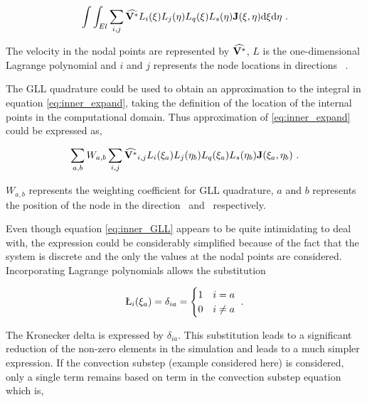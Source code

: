  \begin{equation} \centering
 \label{eq:inner_expand}
 \int\int_{El}\sum_{i,j}\widehat{\Vint}L_{i}(\compone)L_{j}(\comptwo)L_{q}(\compone)L_{s}(\comptwo)\jacobian(\compone, \comptwo)\mathrm{d}\compone \mathrm{d}\comptwo ~.
 \end{equation}
 
 The velocity in the nodal points are represented by $\widehat{\mathbf{V}^{*}}$, $L$ is the one-dimensional Lagrange polynomial and $i$ and $j$ represents the node locations in directions \compone\ \comptwo. 

The GLL quadrature could be used to obtain an approximation to the integral in equation \ref{eq:inner_expand}, taking the definition of the location of the internal points in the computational domain. Thus approximation of \ref{eq:inner_expand} could be expressed as,

\begin{equation} \centering
\label{eq:inner_GLL}
\sum_{a,b}W_{a,b}\sum_{i,j}\widehat{\Vint}_{i,j}L_{i}(\compone_{a})L_{j}(\comptwo_{b})L_{q}(\compone_{a})L_{s}(\comptwo_{b})\jacobian(\compone_{a}, \comptwo_{b}) ~.
\end{equation}

$W_{a,b}$ represents the weighting coefficient for GLL quadrature, $a$ and $b$ represents the position of the node in the direction \compone\ and \comptwo\ respectively. 


Even though equation \ref{eq:inner_GLL} appears to be quite intimidating to deal with, the expression could be considerably simplified because of the fact that the system is discrete and the only the values at the nodal points are considered. Incorporating Lagrange polynomials allows the substitution 

 \begin{gather}
 \label{eq:kronecker}
 \L_{i}(\compone_{a}) = \delta_{ia} = \begin{cases}
 1 & i = a    \\
 0 & i \neq a \\
 \end{cases} ~.
 \end{gather}
 
 The Kronecker delta is expressed by $\delta_{ia}$. This substitution leads to a significant reduction of the non-zero elements in the simulation and leads to a much simpler expression. If the convection substep (example considered here) is considered, only a single term remains based on \Vint term in the convection substep equation which is,


